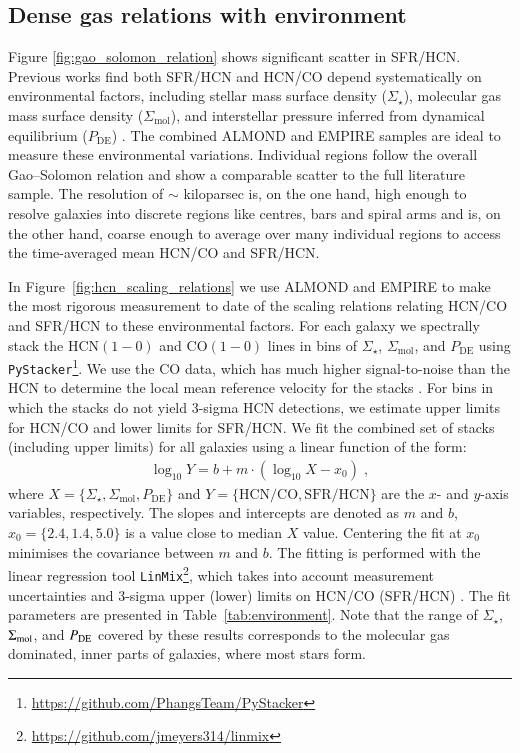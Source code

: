 \documentclass[letter, longauth]{aa} %
\newcommand*{\hcnone}{\ensuremath{\mathrm{HCN(1-0)}}\xspace} %
\newcommand*{\coone}{\ensuremath{\mathrm{CO(1-0)}}\xspace} %
\newcommand*{\sigmol}{\ensuremath{\Sigma_{\text{mol}}}\xspace}  %
\newcommand*{\pde}{\ensuremath{P_{\text{DE}}}\xspace}  %
\newcommand*{\sigstar}{\ensuremath{\Sigma_{\star}}\xspace}  %
\begin{document}
\subsection{Dense gas relations with environment}
\label{sec:environment_relations}

Figure \ref{fig:gao_solomon_relation} shows significant scatter in SFR/HCN. Previous works find both SFR/HCN and HCN/CO depend systematically on environmental factors, including stellar mass surface density (\sigstar ), molecular gas mass surface density (\sigmol ), and interstellar pressure inferred from dynamical equilibrium (\pde ) \citep{Usero2015, Gallagher2018a, Jimenez-Donaire2019}. The combined ALMOND and EMPIRE samples are ideal to measure these environmental variations. 
Individual regions follow the overall Gao--Solomon relation and show a comparable scatter to the full literature sample. The resolution of $\sim$ kiloparsec is, on the one hand, high enough to resolve galaxies into discrete regions like centres, bars and spiral arms and is, on the other hand, coarse enough to average over many individual regions to access the time-averaged mean HCN/CO and SFR/HCN.

In Figure~\ref{fig:hcn_scaling_relations} we use ALMOND and EMPIRE to make the most rigorous measurement to date of the scaling relations relating HCN/CO and SFR/HCN to these environmental factors. For each galaxy we spectrally stack the \hcnone and \coone lines in bins of \sigstar, \sigmol, and \pde using \texttt{PyStacker}\footnote{\url{https://github.com/PhangsTeam/PyStacker}}. We use the CO data, which has much higher signal-to-noise than the HCN to determine the local mean reference velocity for the stacks \citep[see][and references therein for details on the spectral stacking methodology; Appendix~\ref{sec:app:stacking} presents the spectral stacks of HCN and CO]{Neumann2023b}. 
For bins in which the stacks do not yield 3-sigma HCN detections, we estimate upper limits for HCN/CO and lower limits for SFR/HCN. 
We fit the combined set of stacks (including upper limits) for all galaxies using a linear function of the form:
\begin{align}
	\log_{10} Y = b + m \cdot (\log_{10} X - x_0)\;,
    \label{equ:fit_function}
\end{align}
where $X=\{\sigstar, \sigmol, \pde\}$ and $Y=\{\mathrm{HCN/CO}, \mathrm{SFR/HCN}\}$ are the $x$- and $y$-axis variables, respectively. 
The slopes and intercepts are denoted as $m$ and $b$, $x_0=\{2.4, 1.4, 5.0\}$ is a value close to median $X$ value. 
Centering the fit at $x_0$ minimises the covariance between $m$ and $b$. The fitting is performed with the linear regression tool \texttt{LinMix}\footnote{\url{https://github.com/jmeyers314/linmix}}, which takes into account measurement uncertainties and 3-sigma upper (lower) limits on HCN/CO (SFR/HCN) \citep[see e.g.][for more details on the fitting routine]{Neumann2023a}.
The fit parameters are presented in Table~\ref{tab:environment}. Note that the range of $\Sigma_\star$, $\Sigma_{\rm mol}$, and $P_{\rm DE}$ covered by these results corresponds to the molecular gas dominated, inner parts of galaxies, where most stars form.
\end{document}
